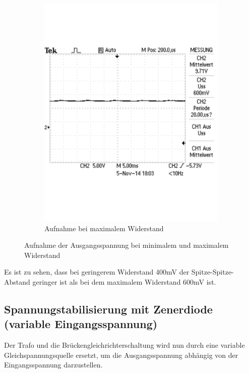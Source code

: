 \documentclass[12pt,a4paper]{article}
\begin{document}
\begin{figure}[H]
        \hfill
        \begin{subfigure}[b]{0.48\textwidth}
                \includegraphics[width=\textwidth , scale = 0.4]{3_1_2.pdf}
                \caption[Aufnahme bei maximalem Widerstand]{Aufnahme bei maximalem Widerstand}
  				\label{fig:3_1_2}
        \end{subfigure}
        \caption{Aufnahme der Ausgangsspannung bei minimalem und maximalem Widerstand}
        \label{fig:3_1}
\end{figure}

Es ist zu sehen, dass bei geringerem Widerstand 400mV der Spitze-Spitze-Abstand geringer ist als bei dem maximalem Widerstand 600mV ist.
\subsection{Spannungstabilisierung mit Zenerdiode (variable Eingangsspannung)}
Der Trafo und die Brückengleichrichterschaltung wird nun durch eine variable Gleichspannungsquelle ersetzt, um die Ausgangsspannung abhängig von der Eingangsspannung darzustellen.
\end{document}
